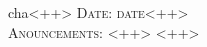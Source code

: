 \documentclass[a4paper,11pt,twoside]{report}
\begin{document}
cha<++>
\LARGE\textsc{Date: date<++>} \\ \LARGE\textsc{Anouncements:}
<++>
 
<++>








\newpage
\end{document}
